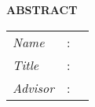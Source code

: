 \begin{center}
  \large\textbf{ABSTRACT}
\end{center}

\vspace{2ex}

\begingroup
\setlength{\tabcolsep}{0pt}

\noindent
\begin{tabularx}{\textwidth}{l >{\centering}m{3em} X}
  \emph{Name}     & : & \name{}         \\

  \emph{Title}    & : & \engtatitle{}   \\

  \emph{Advisor}    & : & \advisor{}   \\

\end{tabularx}
\endgroup




